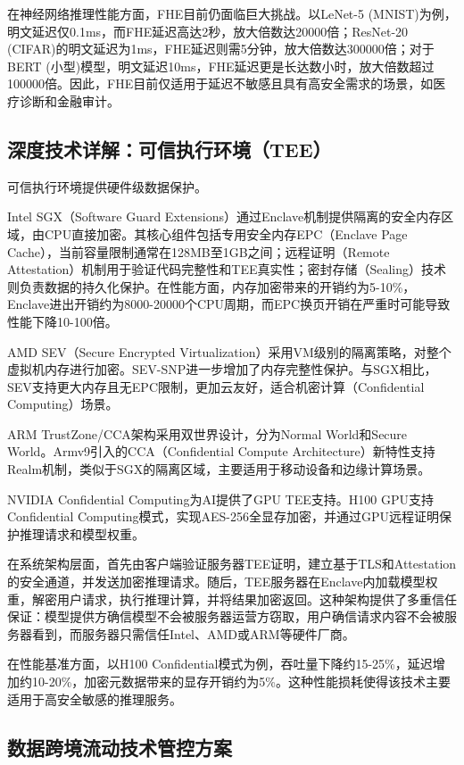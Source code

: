 在神经网络推理性能方面，FHE目前仍面临巨大挑战。以LeNet-5 (MNIST)为例，明文延迟仅0.1ms，而FHE延迟高达2秒，放大倍数达20000倍；ResNet-20 (CIFAR)的明文延迟为1ms，FHE延迟则需5分钟，放大倍数达300000倍；对于BERT (小型)模型，明文延迟10ms，FHE延迟更是长达数小时，放大倍数超过100000倍。因此，FHE目前仅适用于延迟不敏感且具有高安全需求的场景，如医疗诊断和金融审计。

\subsection{深度技术详解：可信执行环境（TEE）}

可信执行环境提供硬件级数据保护\cite{IntelSGX2024, AMDSEV2024, ARMTrustZone2024}。

Intel SGX（Software Guard Extensions）通过Enclave机制提供隔离的安全内存区域，由CPU直接加密。其核心组件包括专用安全内存EPC（Enclave Page Cache），当前容量限制通常在128MB至1GB之间；远程证明（Remote Attestation）机制用于验证代码完整性和TEE真实性；密封存储（Sealing）技术则负责数据的持久化保护。在性能方面，内存加密带来的开销约为5-10\%，Enclave进出开销约为8000-20000个CPU周期，而EPC换页开销在严重时可能导致性能下降10-100倍。

AMD SEV（Secure Encrypted Virtualization）采用VM级别的隔离策略，对整个虚拟机内存进行加密。SEV-SNP进一步增加了内存完整性保护。与SGX相比，SEV支持更大内存且无EPC限制，更加云友好，适合机密计算（Confidential Computing）场景。

ARM TrustZone/CCA架构采用双世界设计，分为Normal World和Secure World。Armv9引入的CCA（Confidential Compute Architecture）新特性支持Realm机制，类似于SGX的隔离区域，主要适用于移动设备和边缘计算场景。

NVIDIA Confidential Computing为AI提供了GPU TEE支持。H100 GPU支持Confidential Computing模式，实现AES-256全显存加密，并通过GPU远程证明保护推理请求和模型权重。

在系统架构层面，首先由客户端验证服务器TEE证明，建立基于TLS和Attestation的安全通道，并发送加密推理请求。随后，TEE服务器在Enclave内加载模型权重，解密用户请求，执行推理计算，并将结果加密返回。这种架构提供了多重信任保证：模型提供方确信模型不会被服务器运营方窃取，用户确信请求内容不会被服务器看到，而服务器只需信任Intel、AMD或ARM等硬件厂商。

在性能基准方面，以H100 Confidential模式为例，吞吐量下降约15-25\%，延迟增加约10-20\%，加密元数据带来的显存开销约为5\%。这种性能损耗使得该技术主要适用于高安全敏感的推理服务。

\subsection{数据跨境流动技术管控方案}

